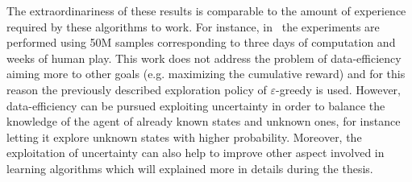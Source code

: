 The extraordinariness of these results is comparable to the amount of experience required by these algorithms to work. For instance, in~\cite{mnih2015human} the experiments are performed using 50M samples corresponding to three days of computation and weeks of human play. This work does not address the problem of data-efficiency aiming more to other goals (e.g. maximizing the cumulative reward) and for this reason the previously described exploration policy of $\varepsilon$-greedy is used. However, data-efficiency can be pursued exploiting uncertainty in order to balance the knowledge of the agent of already known states and unknown ones, for instance letting it explore unknown states with higher probability. Moreover, the exploitation of uncertainty can also help to improve other aspect involved in learning algorithms which will explained more in details during the thesis.

